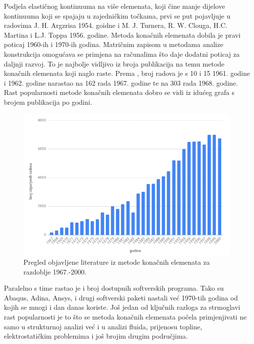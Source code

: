 \documentclass[a4paper,twoside,12pt]{memoir} %
\begin{document}
Podjela elastičnog kontinuuma na više elemenata, koji čine manje dijelove kontinuuma koji se spajaju u zajedničkim točkama, prvi se put pojavljuje u radovima J. H. Argzrisa 1954. goidne i M. J. Turnera, R. W. Clouga, H.C. Martina i L.J. Toppa 1956. godine. Metoda konačnih elemenata dobila je pravi poticaj 1960-ih i 1970-ih godina. Matričnim zapisom u metodama analize konstrukcija omogućava se primjena na računalima što daje dodatni poticaj za daljnji razvoj. To je najbolje vidljivo iz broja publikacija na temu metode konačnih elemenata koji naglo raste. Prema \cite{jurica_soric_117}, broj radova je s 10 i 15 1961. godine i 1962. godine narastao na 162 rada 1967. godine te na 303 rada 1968. godine. Rast popularnosti metode konačnih elemenata dobro se vidi iz idućeg grafa s brojem publikacija po godini.
\begin{figure}[h!t]
\begin{center}
\includegraphics[scale=0.5]{pictures/chapter_fem/broj_objavljenih_radova.png}
\caption{Pregled objavljene literature iz metode konačnih elemenata za razdoblje 1967.-2000. \cite{jurica_soric_76}}
\end{center}
\end{figure}
Paralelno s time rastao je i broj dostupnih softverskih programa. Tako su Abaqus, Adina, Ansys, i drugi softverski paketi nastali već 1970-tih godina od kojih se mnogi i dan danas koriste. Još jedan od ključnih razloga za strmoglavi rast popularnosti je to što se metoda konačnih elemenata počela primjenjivati ne samo u strukturnoj analizi već i u analizi fluida, prijenosu topline, elektrostatičkim problemima i još brojim drugim područjima. \par
\end{document}
